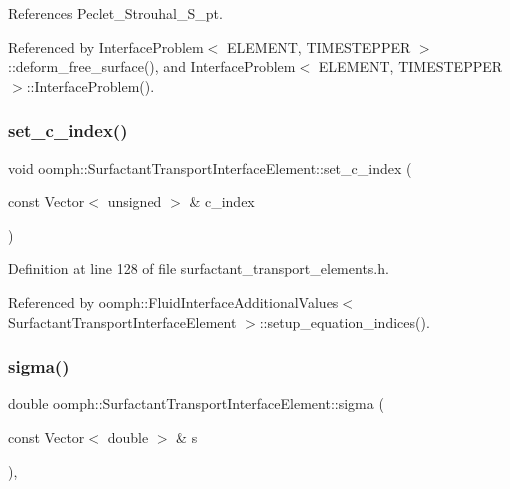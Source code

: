 References Peclet\+\_\+\+Strouhal\+\_\+\+S\+\_\+pt.



Referenced by Interface\+Problem$<$ E\+L\+E\+M\+E\+N\+T, T\+I\+M\+E\+S\+T\+E\+P\+P\+E\+R $>$\+::deform\+\_\+free\+\_\+surface(), and Interface\+Problem$<$ E\+L\+E\+M\+E\+N\+T, T\+I\+M\+E\+S\+T\+E\+P\+P\+E\+R $>$\+::\+Interface\+Problem().

\mbox{\label{classoomph_1_1SurfactantTransportInterfaceElement_aaf7988dfac3e02018c591f2f9e34f644}} 
\subsubsection{\texorpdfstring{set\+\_\+c\+\_\+index()}{set\_c\_index()}}
{\footnotesize\ttfamily void oomph\+::\+Surfactant\+Transport\+Interface\+Element\+::set\+\_\+c\+\_\+index (\begin{DoxyParamCaption}\item[{const Vector$<$ unsigned $>$ \&}]{c\+\_\+index }\end{DoxyParamCaption})\hspace{0.3cm}{\ttfamily [inline]}}



Definition at line 128 of file surfactant\+\_\+transport\+\_\+elements.\+h.



Referenced by oomph\+::\+Fluid\+Interface\+Additional\+Values$<$ Surfactant\+Transport\+Interface\+Element $>$\+::setup\+\_\+equation\+\_\+indices().

\mbox{\label{classoomph_1_1SurfactantTransportInterfaceElement_a1710057c610ccccc06ef41f34f086aae}} 
\subsubsection{\texorpdfstring{sigma()}{sigma()}}
{\footnotesize\ttfamily double oomph\+::\+Surfactant\+Transport\+Interface\+Element\+::sigma (\begin{DoxyParamCaption}\item[{const Vector$<$ double $>$ \&}]{s }\end{DoxyParamCaption})\hspace{0.3cm}{\ttfamily [protected]}, {\ttfamily [virtual]}}

